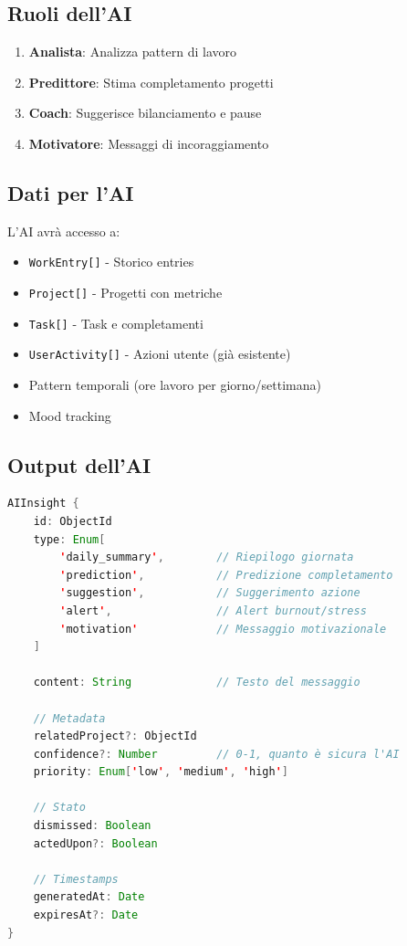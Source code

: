 \documentclass[11pt,a4paper]{article}
\begin{document}
\subsection{Ruoli dell'AI}

\begin{enumerate}
    \item \textbf{Analista}: Analizza pattern di lavoro
    \item \textbf{Predittore}: Stima completamento progetti
    \item \textbf{Coach}: Suggerisce bilanciamento e pause
    \item \textbf{Motivatore}: Messaggi di incoraggiamento
\end{enumerate}

\subsection{Dati per l'AI}

L'AI avrà accesso a:

\begin{itemize}
    \item \texttt{WorkEntry[]} - Storico entries
    \item \texttt{Project[]} - Progetti con metriche
    \item \texttt{Task[]} - Task e completamenti
    \item \texttt{UserActivity[]} - Azioni utente (già esistente)
    \item Pattern temporali (ore lavoro per giorno/settimana)
    \item Mood tracking
\end{itemize}

\subsection{Output dell'AI}


\begin{lstlisting}[language=Java, caption=AIInsight Schema - Pseudocodice]
AIInsight {
    id: ObjectId
    type: Enum[
        'daily_summary',        // Riepilogo giornata
        'prediction',           // Predizione completamento
        'suggestion',           // Suggerimento azione
        'alert',                // Alert burnout/stress
        'motivation'            // Messaggio motivazionale
    ]
    
    content: String             // Testo del messaggio
    
    // Metadata
    relatedProject?: ObjectId
    confidence?: Number         // 0-1, quanto è sicura l'AI
    priority: Enum['low', 'medium', 'high']
    
    // Stato
    dismissed: Boolean
    actedUpon?: Boolean
    
    // Timestamps
    generatedAt: Date
    expiresAt?: Date
}
\end{lstlisting}
\end{document}
